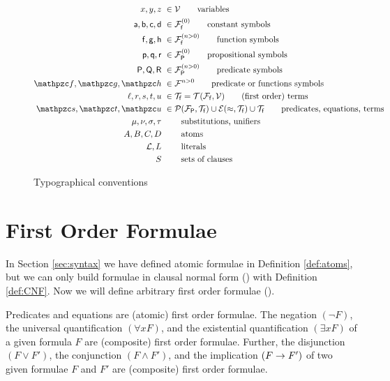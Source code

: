 \begin{figure}[hbt]
	\begin{align*}
	x,y,z &\ \in\mcV \tag*{variables} \\
	\ma,\mb,\mc,\md &\ \in\mcFfn[{0}]\tag*{constant symbols} \\
	\mf, \mg, \mh &\ \in\mcFfn[{n>0}]\tag*{function symbols} \\
	\mpp, \mq, \mr &\ \in\mcFPn[{0}]\tag*{propositional symbols}\\
	\mP, \mQ, \mR &\ \in\mcFPn[{n>0}]\tag*{predicate symbols}\\
	\mcf, \mcg, \mch &\ \in\mcF^{n>0} \tag*{predicate or functions symbols}\\
	\ell, r, s,t,u &\ \in\mcTf = \mcTFfV\tag*{(first order) terms}\\
	\mcs, \mct, \mcu &\ \in \mcPT \cup \mcET \cup \mcTf \tag*{predicates, equations, terms}\\
	\mu, \nu, \sigma, \tau &\ \tag*{substitutions, unifiers}\\
	A,B,C,D &\ \tag*{atoms} \\
	\mcL, L &\ \tag*{literals} \\
	S &\ \tag*{sets of clauses}
	\end{align*}
	\caption{Typographical conventions}
	\label{fig:conventions}
\end{figure}

\section{First Order Formulae}

In Section \ref{sec:syntax} we have defined atomic formulae in Definition \ref{def:atoms}, 
but we can only build formulae in clausal normal form (\CNF) with Definition \vref{def:CNF}.
Now we will define arbitrary first order formulae (\FOF).

\begin{definition}[\FOF]
	Predicates and equations are (atomic) first order formulae. 
	The negation $(\lnot F)$, 
	the universal quantification $(\forall x F)$, 
	and the existential quantification $(\exists x F)$ 
	of a given formula $F$ are (composite) first order formulae.
	Further, the disjunction $(F \lor F')$, 
	the conjunction $(F \land F') $, 
	and the implication $(F \rightarrow F') $ 
	of two given formulae $F$ and $F'$ 
	are (composite) first order formulae.
\end{definition}

